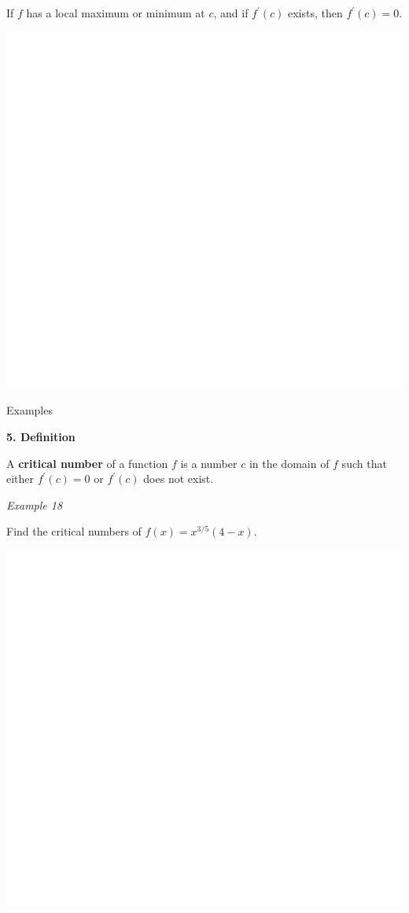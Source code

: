\documentclass[]{book}
\begin{document}
If \(f\) has a local maximum or minimum at \(c\), and if \(f^\prime(c)\) exists, then \(f^\prime(c) = 0.\)

\begin{center}\includegraphics[width=1\linewidth]{figure/LB32-1} \end{center}

\newpage

\newpage

Examples

\newpage

\textbf{5. Definition}

A \textbf{critical number} of a function \(f\) is a number \(c\) in the domain of \(f\) such that either \(f^\prime(c) = 0\) or \(f^\prime(c)\) does not exist.

\emph{Example 18}

Find the critical numbers of \(f(x)=x^{3/5}(4-x).\)

\begin{center}\includegraphics[width=1\linewidth]{figure/LB33-1} \end{center}
\end{document}

